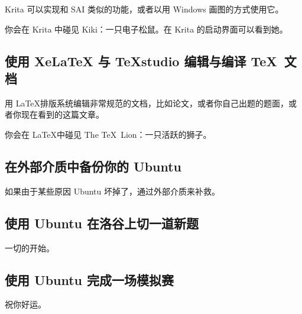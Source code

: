 \documentclass[UTF-8]{ctexart}
\begin{document}
			Krita 可以实现和 SAI 类似的功能，或者以用 Windows 画图的方式使用它。
			
			你会在 Krita 中碰见 Kiki：一只电子松鼠。在 Krita 的启动界面可以看到她。
			
		\subsection{使用 XeLaTeX 与 TeXstudio 编辑与编译 \TeX ~文档}
			
			用 \LaTeX 排版系统编辑非常规范的文档，比如论文，或者你自己出题的题面，或者你现在看到的这篇文章。
			
			你会在 \LaTeX 中碰见 The \TeX ~Lion：一只活跃的狮子。
			
		\subsection{在外部介质中备份你的 Ubuntu}
		
			如果由于某些原因 Ubuntu 坏掉了，通过外部介质来补救。
			
		\subsection{使用 Ubuntu 在洛谷上切一道新题}
		
			一切的开始。
			
		\subsection{使用 Ubuntu 完成一场模拟赛}
		
			祝你好运。
			
\end{document}
